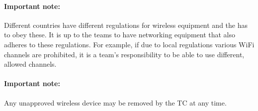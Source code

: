 \paragraph*{Important note:} Different countries have different regulations for wireless equipment and the  has to obey these.
It is up to the teams to have networking equipment that also adheres to these regulations. For example, if due to local regulations various WiFi channels are prohibited, it is a team's responsibility to be able to use different, allowed channels.

\paragraph*{Important note:} Any unapproved wireless device may be removed by the TC at any time.

